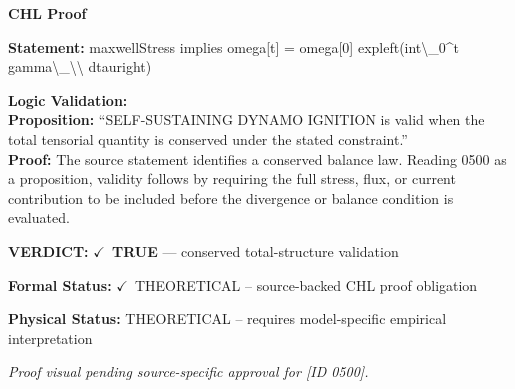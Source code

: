 \vspace{0.45em}
\noindent\textbf{CHL Proof}\par
\textbf{Statement:} maxwellStress implies omega[t] = omega[0] expleft(int\textbackslash{}\_0\textasciicircum{}t gamma\textbackslash{}\_\textbackslash{}\textbackslash{} dtauright)

\textbf{Logic Validation:}\\
\textbf{Proposition:} ``SELF-SUSTAINING DYNAMO IGNITION is valid when the total tensorial quantity is conserved
under the stated constraint.''\\
\textbf{Proof:} The source statement identifies a conserved balance law. Reading 0500 as a proposition,
validity follows by requiring the full stress, flux, or current contribution to be
included before the divergence or balance condition is evaluated.

\textbf{VERDICT:} \ensuremath{\checkmark}\ \textbf{TRUE} --- conserved total-structure validation

\textbf{Formal Status:} \ensuremath{\checkmark}\ THEORETICAL -- source-backed CHL proof obligation

\textbf{Physical Status:} THEORETICAL -- requires model-specific empirical interpretation
\par\vspace{0.45em}
\par
\vfill
\begingroup\footnotesize\itshape
Proof visual pending source-specific approval for [ID 0500].
\par\endgroup
\vfill
\endgroup
\endgroup
